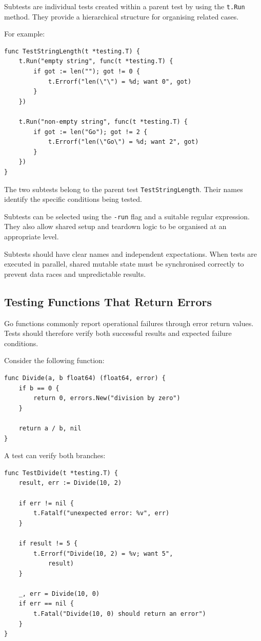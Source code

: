 Subtests are individual tests created within a parent test by using the \texttt{t.Run} method. They provide a hierarchical structure for organising related cases.

For example:

\begin{lstlisting}
func TestStringLength(t *testing.T) {
    t.Run("empty string", func(t *testing.T) {
        if got := len(""); got != 0 {
            t.Errorf("len(\"\") = %d; want 0", got)
        }
    })

    t.Run("non-empty string", func(t *testing.T) {
        if got := len("Go"); got != 2 {
            t.Errorf("len(\"Go\") = %d; want 2", got)
        }
    })
}
\end{lstlisting}

The two subtests belong to the parent test \texttt{TestStringLength}. Their names identify the specific conditions being tested.

Subtests can be selected using the \texttt{-run} flag and a suitable regular expression. They also allow shared setup and teardown logic to be organised at an appropriate level.

Subtests should have clear names and independent expectations. When tests are executed in parallel, shared mutable state must be synchronised correctly to prevent data races and unpredictable results.

\subsection{Testing Functions That Return Errors}

Go functions commonly report operational failures through error return values. Tests should therefore verify both successful results and expected failure conditions.

Consider the following function:

\begin{lstlisting}
func Divide(a, b float64) (float64, error) {
    if b == 0 {
        return 0, errors.New("division by zero")
    }

    return a / b, nil
}
\end{lstlisting}

A test can verify both branches:

\begin{lstlisting}
func TestDivide(t *testing.T) {
    result, err := Divide(10, 2)

    if err != nil {
        t.Fatalf("unexpected error: %v", err)
    }

    if result != 5 {
        t.Errorf("Divide(10, 2) = %v; want 5",
            result)
    }

    _, err = Divide(10, 0)
    if err == nil {
        t.Fatal("Divide(10, 0) should return an error")
    }
}
\end{lstlisting}

